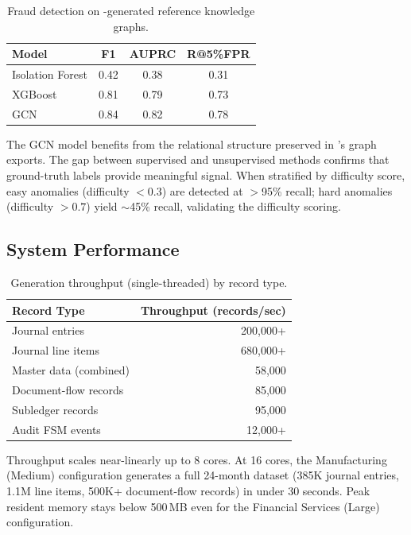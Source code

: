 \begin{table}[t]
\centering
\caption{Fraud detection on \system{}-generated reference knowledge graphs.}
\label{tab:ml_results}
\small
\begin{tabular}{lccc}
\toprule
\textbf{Model} & \textbf{F1} & \textbf{AUPRC} & \textbf{R@5\%FPR} \\
\midrule
Isolation Forest   & 0.42 & 0.38 & 0.31 \\
XGBoost            & 0.81 & 0.79 & 0.73 \\
GCN                & 0.84 & 0.82 & 0.78 \\
\bottomrule
\end{tabular}
\end{table}

The GCN model benefits from the relational structure preserved in
\system{}'s graph exports.  The gap between supervised and unsupervised
methods confirms that ground-truth labels provide meaningful signal.
When stratified by difficulty score, easy anomalies (difficulty $< 0.3$)
are detected at $>$95\% recall; hard anomalies (difficulty $> 0.7$)
yield $\sim$45\% recall, validating the difficulty scoring.

\subsection{System Performance}
\label{sec:exp_performance}

\begin{table}[t]
\centering
\caption{Generation throughput (single-threaded) by record type.}
\label{tab:throughput}
\small
\begin{tabular}{lr}
\toprule
\textbf{Record Type} & \textbf{Throughput (records/sec)} \\
\midrule
Journal entries           & 200{,}000+ \\
Journal line items        & 680{,}000+ \\
Master data (combined)    & 58{,}000 \\
Document-flow records     & 85{,}000 \\
Subledger records         & 95{,}000 \\
Audit FSM events          & 12{,}000+ \\
\bottomrule
\end{tabular}
\end{table}

Throughput scales near-linearly up to 8 cores.  At 16 cores, the
Manufacturing (Medium) configuration generates a full 24-month dataset
(385K journal entries, 1.1M line items, 500K+ document-flow records)
in under 30 seconds.  Peak resident memory stays below 500\,MB even
for the Financial Services (Large) configuration.

